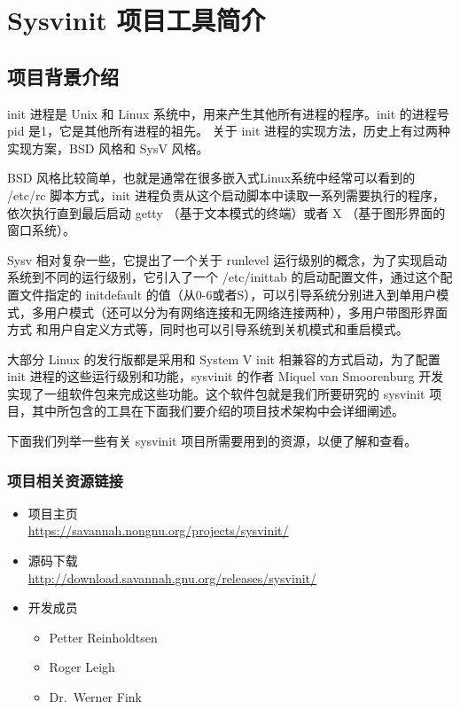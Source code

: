 \chapter{Sysvinit 项目工具简介}

\section{项目背景介绍}

init 进程是 Unix 和 Linux 系统中，用来产生其他所有进程的程序。init
的进程号 pid 是1，它是其他所有进程的祖先。 关于 init
进程的实现方法，历史上有过两种实现方案，BSD 风格和 SysV 风格。

BSD 风格比较简单，也就是通常在很多嵌入式Linux系统中经常可以看到的 /etc/rc
脚本方式，init
进程负责从这个启动脚本中读取一系列需要执行的程序，依次执行直到最后启动
getty （基于文本模式的终端）或者 X （基于图形界面的窗口系统）。

Sysv 相对复杂一些，它提出了一个关于 runlevel
运行级别的概念，为了实现启动系统到不同的运行级别，它引入了一个
/etc/inittab 的启动配置文件，通过这个配置文件指定的 initdefault
的值（从0-6或者S），可以引导系统分别进入到单用户模式，多用户模式（还可以分为有网络连接和无网络连接两种），多用户带图形界面方式
和用户自定义方式等，同时也可以引导系统到关机模式和重启模式。

大部分 Linux 的发行版都是采用和 System V init 相兼容的方式启动，为了配置
init 进程的这些运行级别和功能，sysvinit 的作者 Miquel van Smoorenburg
开发实现了一组软件包来完成这些功能。这个软件包就是我们所要研究的
sysvinit
项目，其中所包含的工具在下面我们要介绍的项目技术架构中会详细阐述。

下面我们列举一些有关 sysvinit 项目所需要用到的资源，以便了解和查看。

\subsection{项目相关资源链接}

\begin{itemize}
\item
  项目主页\\\url{https://savannah.nongnu.org/projects/sysvinit/}
\item
  源码下载\\\url{http://download.savannah.gnu.org/releases/sysvinit/}
\item
  开发成员
  \begin{itemize}
  \item
    Petter Reinholdtsen
  \item
    Roger Leigh
  \item
    Dr.~Werner Fink
  \end{itemize}
\end{itemize}
